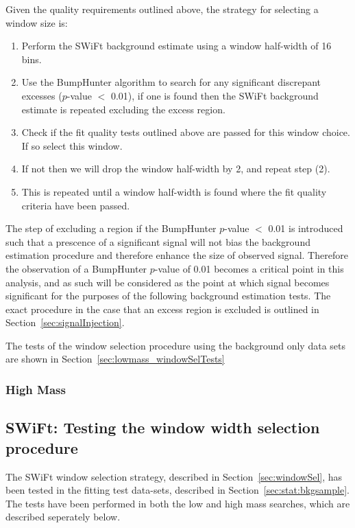 \noindent
Given the quality requirements outlined above, the strategy for selecting a window size is:
\begin{enumerate}
\item Perform the SWiFt background estimate using a window half-width of 16 bins.
\item Use the {\sc BumpHunter} algorithm to search for any significant discrepant excesses (\mbox{$p$-value} $<$ 0.01),
  if one is found then the SWiFt background estimate is repeated excluding the excess region.
\item Check if the fit quality tests outlined above are passed for this window choice. If so select this window.
\item If not then we will drop the window half-width by 2, and repeat step (2).
\item This is repeated until a window half-width is found where the fit quality criteria have been passed.
\end{enumerate}
The step of excluding a region if the {\sc BumpHunter} \mbox{$p$-value} $<$ 0.01 is introduced such that
a prescence of a significant signal will not bias the background estimation procedure and therefore enhance the size of observed signal.
Therefore the observation of a {\sc BumpHunter} \mbox{$p$-value} of 0.01 becomes a critical point in this analysis,
and as such will be considered as the point at which signal becomes significant for the purposes of the following background estimation tests.
The exact procedure in the case that an excess region is excluded is outlined in Section~\ref{sec:signalInjection}.

\noindent
The tests of the window selection procedure using the background only data sets are shown in Section~\ref{sec:lowmass_windowSelTests}

\subsubsection{High Mass} 
\label{sec:highmass_windowSel}

\subsection{SWiFt: Testing the window width selection procedure}

The SWiFt window selection strategy, described in Section~\ref{sec:windowSel}, has been tested in the fitting test data-sets, described in Section~\ref{sec:stat:bkgsample}.
The tests have been performed in both the low and high mass searches, which are described seperately below.

